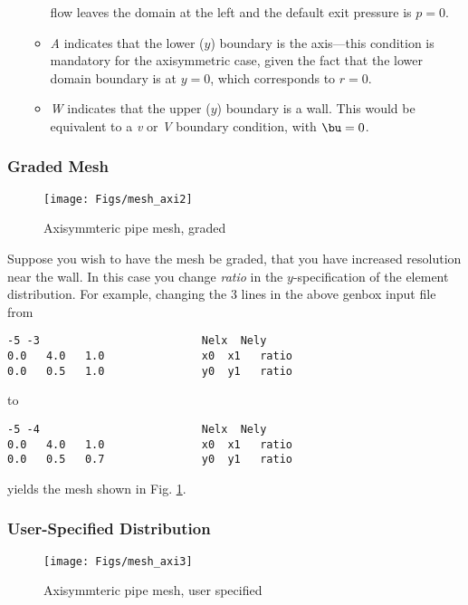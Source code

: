 \begin{itemize}
\begin{itemize}
        flow leaves the domain at the left and the default exit pressure is \(p=0\).
      \item
        {\em A} indicates that the lower (\(y\)) boundary is the axis---this condition
        is mandatory for the axisymmetric case, given the fact that the lower domain
        boundary is at \(y=0\), which corresponds to \(r=0\).
      \item
        {\em W} indicates that the upper (\(y\)) boundary is a wall.  This would be
        equivalent to a {\em v} or {\em V} boundary condition, with \(\bu=0\).
    \end{itemize}
\end{itemize}


\subsubsection{Graded Mesh}
\begin{figure}
  \centering
  \texttt{[image: Figs/mesh\_axi2]}
  \caption{Axisymmteric pipe mesh, graded}
  \label{fig:mesh_axi2}
\end{figure}

Suppose you wish to have the mesh be graded,
that you have increased resolution near the wall.
In this case you change {\em ratio} in the \(y\)-specification
of the element distribution.  For example, changing the 3 lines
in the above genbox input file from

\begin{verbatim}
-5 -3                         Nelx  Nely
0.0   4.0   1.0               x0  x1   ratio
0.0   0.5   1.0               y0  y1   ratio
\end{verbatim}

\noindent
to

\begin{verbatim}
-5 -4                         Nelx  Nely
0.0   4.0   1.0               x0  x1   ratio
0.0   0.5   0.7               y0  y1   ratio
\end{verbatim}

\noindent
yields the mesh shown in Fig. \ref{fig:mesh_axi2}.


\subsubsection{User-Specified Distribution}
\begin{figure}
  \centering
  \texttt{[image: Figs/mesh\_axi3]}
  \caption{Axisymmteric pipe mesh, user specified}
  \label{fig:mesh_axi3}
\end{figure}

